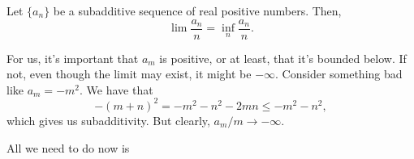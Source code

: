 \begin{example}
\begin{lemma}
  Let $\{a_n\}$ be a subadditive sequence of real positive numbers. Then,
  \[ \lim \frac{a_n}{n} = \inf_n \frac{a_n}{n}. \]
  \label{lem:subadditive-lemma}
\end{lemma}

For us, it's important that $a_m$ is positive, or at least, that it's bounded below. If not, even though the limit may exist, it might be $-\infty$. Consider something bad like $a_m = -m^2$. We have that
\[ -(m+n)^2 = -m^2 - n^2 - 2 m n \leq -m^2 - n^2, \]
which gives us subadditivity. But clearly, $a_m/m \to -\infty$.  

All we need to do now is 

\end{example}
